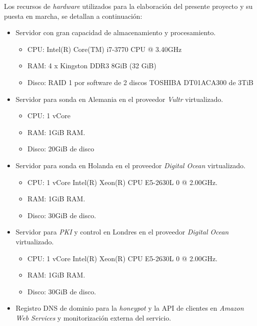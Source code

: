 Los recursos de \emph{hardware} utilizados para la elaboración del presente proyecto y su puesta en marcha, se detallan a continuación:

\begin{itemize}
    \item Servidor con gran capacidad de almacenamiento y procesamiento.
    \begin{itemize}
        \item CPU: Intel(R) Core(TM) i7-3770 CPU @ 3.40GHz
        \item RAM: 4 x Kingston DDR3 8GiB (32 GiB)
        \item Disco: RAID 1 por software de 2 discos TOSHIBA DT01ACA300 de 3TiB
    \end{itemize}

    \item Servidor para sonda en Alemania en el proveedor \emph{Vultr} virtualizado.
    \begin{itemize}
        \item CPU: 1 vCore
        \item RAM: 1GiB RAM.
        \item Disco: 20GiB de disco
    \end{itemize}

    \item Servidor para sonda en Holanda en el proveedor \emph{Digital Ocean} virtualizado.
    \begin{itemize}
        \item CPU: 1 vCore Intel(R) Xeon(R) CPU E5-2630L 0 @ 2.00GHz.
        \item RAM: 1GiB RAM.
        \item Disco: 30GiB de disco.
    \end{itemize}

    \item Servidor para \emph{PKI} y control en Londres en el proveedor \emph{Digital Ocean} virtualizado.
    \begin{itemize}
        \item CPU: 1 vCore Intel(R) Xeon(R) CPU E5-2630L 0 @ 2.00GHz.
        \item RAM: 1GiB RAM.
        \item Disco: 30GiB de disco.
    \end{itemize}

    \item Registro DNS de dominio para la \emph{honeypot} y la API de clientes en \emph{Amazon Web Services} y monitorización
    externa del servicio.

\end{itemize}


